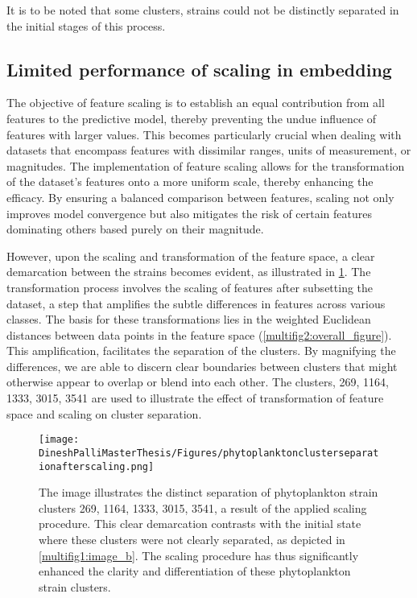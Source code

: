 \documentclass[12pt,a4paper]{article}
\begin{document}
It is to be noted that some clusters, strains could not be distinctly separated in the initial stages of this process.

\subsection{Limited performance of scaling in embedding}
The objective of feature scaling is to establish an equal contribution from all features to the predictive model, thereby preventing the undue influence of features with larger values. This becomes particularly crucial when dealing with datasets that encompass features with dissimilar ranges, units of measurement, or magnitudes. The implementation of feature scaling allows for the transformation of the dataset’s features onto a more uniform scale, thereby enhancing the efficacy. By ensuring a balanced comparison between features, scaling not only improves model convergence but also mitigates the risk of certain features dominating others based purely on their magnitude.

However, upon the scaling and transformation of the feature space, a clear demarcation between the strains becomes evident, as illustrated in \ref{clustersafterscaling}. The transformation process involves the scaling of features after subsetting the dataset, a step that amplifies the subtle differences in features across various classes. The basis for these transformations lies in the weighted Euclidean distances between data points in the feature space (\ref{multifig2:overall_figure}). This amplification, facilitates the separation of the clusters. By magnifying the differences, we are able to discern clear boundaries between clusters that might otherwise appear to overlap or blend into each other. The clusters, 269, 1164, 1333, 3015, 3541 are used to illustrate the effect of transformation of feature space and scaling on cluster separation.

\begin{figure}
  \centering
  \texttt{[image: DineshPalliMasterThesis/Figures/phytoplanktonclusterseparationafterscaling.png]}
  \caption{The image illustrates the distinct separation of phytoplankton strain clusters 269, 1164, 1333, 3015, 3541, a result of the applied scaling procedure. This clear demarcation contrasts with the initial state where these clusters were not clearly separated, as depicted in \ref{multifig1:image_b}. The scaling procedure has thus significantly enhanced the clarity and differentiation of these phytoplankton strain clusters.}
  \label{clustersafterscaling}
\end{figure}
\end{document}
